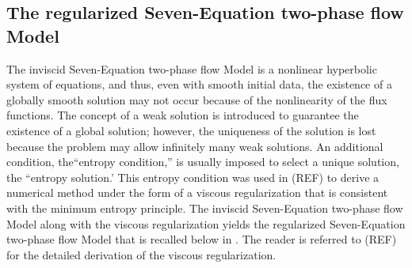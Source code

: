 \documentclass[preprint,10pt]{elsarticle}
\begin{document}
%
\subsection{The regularized Seven-Equation two-phase flow Model}
%
The inviscid Seven-Equation two-phase flow Model is a nonlinear hyperbolic system of equations, and thus, even with smooth initial data, the existence of a 
globally smooth solution may not occur because of the nonlinearity of the flux functions. The concept of a weak
solution is introduced to guarantee the existence of a global solution; however, the uniqueness of the solution is lost because the problem may
allow infinitely many weak solutions.  An additional condition, the``entropy condition,'' is usually imposed to select a
unique solution, the ``entropy solution.' This entropy condition was used in (REF) to derive a numerical method under the form of a viscous regularization that is consistent with the minimum entropy principle. The inviscid Seven-Equation two-phase flow Model along with the viscous regularization yields the regularized Seven-Equation two-phase flow Model that is recalled below in . The reader is referred to (REF) for the detailed derivation of the viscous regularization.
%
\end{document}
